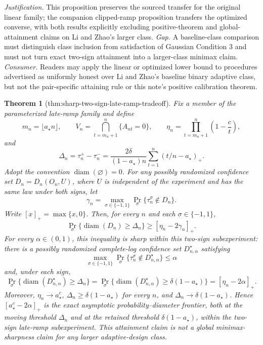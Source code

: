 \documentclass{article}
\newtheorem{theorem}{Theorem}
\begin{document}
\par\smallskip\noindent \textit{Justification.} This proposition preserves the sourced transfer for the original linear family; the companion clipped-ramp proposition transfers the optimized converse, with both results explicitly excluding positive-theorem and global-attainment claims on Li and Zhao's larger class. \textit{Gap.} A baseline-class comparison must distinguish class inclusion from satisfaction of Gaussian Condition 3 and must not turn exact two-sign attainment into a larger-class minimax claim. \textit{Consumer.} Readers may apply the linear or optimized lower bound to procedures advertised as uniformly honest over Li and Zhao's baseline binary adaptive class, but not the pair-specific attaining rule or this note's positive calibration theorem.

\begin{theorem}[thm:sharp-two-sign-late-ramp-tradeoff]\label{thm:sharp-two-sign-late-ramp-tradeoff}
Fix a member of the parameterized late-ramp family and define
\[
 m_n=\lfloor a_\star n\rfloor,\qquad
 V_n=\bigcap_{t=m_n+1}^{n}\{A_{nt}=0\},\qquad
 \eta_n=\prod_{t=m_n+1}^{n}\left(1-\frac ct\right),
\]
and
\[
 \Delta_n=\tau_n^+-\tau_n^-
 =\frac{2\delta}{(1-a_\star)n}
   \sum_{t=1}^{n}(t/n-a_\star)_+.
\]
Adopt the convention \(\operatorname{diam}(\varnothing)=0\). For any possibly randomized confidence set \(D_n=D_n(O_n,U)\), where \(U\) is independent of the experiment and has the same law under both signs, let
\[
 \gamma_n=\max_{\sigma\in\{-1,1\}}
 \Pr_\sigma\{\tau_n^\sigma\notin D_n\}.
\]
Write \([x]_+=\max\{x,0\}\). Then, for every \(n\) and each \(\sigma\in\{-1,1\}\),
\[
 \Pr_\sigma\{\operatorname{diam}(D_n)\ge \Delta_n\}
 \ge [\eta_n-2\gamma_n]_+.
\]
For every \(\alpha\in(0,1)\), this inequality is sharp within this two-sign subexperiment: there is a possibly randomized complete-log confidence set \(D_{n,\alpha}^\star\) satisfying
\[
 \max_{\sigma\in\{-1,1\}}
 \Pr_\sigma\{\tau_n^\sigma\notin D_{n,\alpha}^\star\}\le\alpha
\]
and, under each sign,
\[
 \Pr_\sigma\{\operatorname{diam}(D_{n,\alpha}^\star)\ge\Delta_n\}
 =\Pr_\sigma\{\operatorname{diam}(D_{n,\alpha}^\star)\ge\delta(1-a_\star)\}
 =[\eta_n-2\alpha]_+.
\]
Moreover, \(\eta_n\to a_\star^c\), \(\Delta_n\ge\delta(1-a_\star)\) for every \(n\), and \(\Delta_n\to\delta(1-a_\star)\). Hence \([a_\star^c-2\alpha]_+\) is the exact asymptotic probability--diameter frontier, both at the moving threshold \(\Delta_n\) and at the retained threshold \(\delta(1-a_\star)\), within the two-sign late-ramp subexperiment. This attainment claim is not a global minimax-sharpness claim for any larger adaptive-design class.
\end{theorem}
\end{document}

